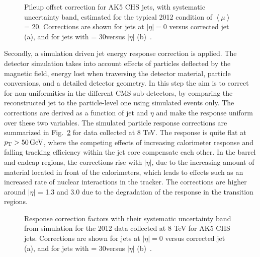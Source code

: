 \begin{figure}[!htb]
\centering
{}
\caption{Pileup offset correction for AK5 CHS jets, with systematic uncertainty band, estimated for the typical 2012 condition of $\left\langle\mu\right\rangle$ = 20. Corrections are shown for jets at $|\eta| = 0$ versus corrected jet \pt (a), and for jets with \pt = 30\GeV versus $|\eta|$ (b)~\cite{Khachatryan:2016kdb}.}
\label{fig:pucorr_ak5chs}
\end{figure}

Secondly, a simulation driven jet energy response correction is applied. The detector simulation takes into account effects of particles deflected by the magnetic field, energy lost when traversing the detector material, particle conversions, and a detailed detector geometry. In this step the aim is to correct for non-uniformities in the different CMS sub-detectors, by comparing the reconstructed jet \pt to the particle-level one using simulated events only. The corrections are derived as a function of jet \pt and $\eta$ and make the response uniform over these two variables. The simulated particle response corrections are summarized in Fig.~\ref{fig:MCcorr_ak5chs} for data collected at 8 TeV. The response is quite flat at $p_{\mathrm{T}} > 50\,\text{Ge\hspace{-.08em}V}$, where the competing effects of increasing calorimeter response and falling tracking efficiency within the jet core compensate each other. In the barrel and endcap regions, the corrections rise with $|\eta|$, due to the increasing amount of material located in front of the calorimeters, which leads to effects such as an increased rate of nuclear interactions in the tracker. The corrections are higher around $|\eta|$ = 1.3 and 3.0 due to the degradation of the response in the transition regions.

\begin{figure}[!htb]
\centering
{}
\caption{Response correction factors with their systematic uncertainty band from simulation for the 2012 data collected at 8 TeV for AK5 CHS jets. Corrections are shown for jets at $|\eta| = 0$ versus corrected jet \pt (a), and for jets with \pt = 30\GeV versus $|\eta|$ (b)~\cite{Khachatryan:2016kdb}.}
\label{fig:MCcorr_ak5chs}
\end{figure}

